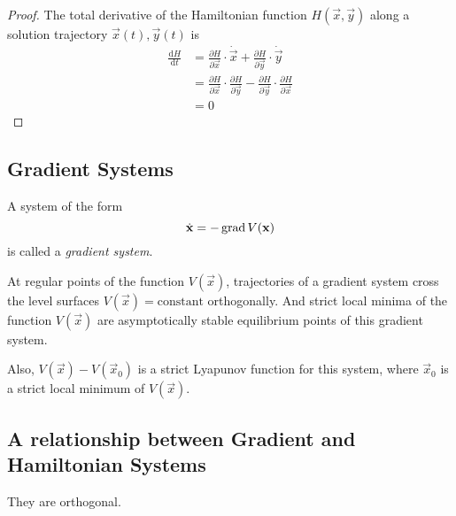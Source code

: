 \begin{proof}
	The total derivative of the Hamiltonian function $H(\vec x, \vec y)$ along a solution trajectory $\vec x(t), \vec y(t)$ is
	\begin{align*}
		\frac{\mathrm dH}{\mathrm dt} 	&= \frac{\partial H}{\partial \vec x} \cdot \dot{\vec x} + \frac{\partial H}{\partial \vec y} \cdot \dot{\vec y} \\
										&= \frac{\partial H}{\partial \vec x} \cdot \frac{\partial H}{\partial \vec y} - \frac{\partial H}{\partial \vec y} \cdot \frac{\partial H}{\partial \vec x} \\
										&= 0
	\end{align*}
\end{proof}

\subsection{Gradient Systems}
A system of the form
\begin{equation}
	\dot{\boldsymbol{\mathbf{x}}} = -\operatorname{grad}{V(\boldsymbol{\mathbf{x}})}
\end{equation}
is called a \emph{gradient system}.

\begin{theorem}
	At regular points of the function $V(\vec x)$, trajectories of a gradient system cross the level surfaces $V(\vec x) = \text{constant}$ orthogonally. And strict local minima of the function $V(\vec x)$ are asymptotically stable equilibrium points of this gradient system.
\end{theorem}

Also, $V(\vec x) - V(\vec x_0)$ is a strict Lyapunov function for this system, where $\vec x_0$ is a strict local minimum of $V(\vec x)$.

\subsection{A relationship between Gradient and Hamiltonian Systems}
They are orthogonal.